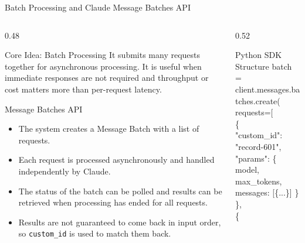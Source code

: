 \documentclass[
        11pt,
        compress,
        xcolor={dvipsnames}
    ]{beamer}
\begin{document}
\begin{frame}[shrink=2]{Batch Processing and Claude Message Batches API}
  \begin{columns}[T]
    \begin{column}{0.48\textwidth}
    \scriptsize
      \begin{block}{Core Idea: Batch Processing}
        It submits many requests together for asynchronous processing.
        It is useful when immediate responses are not required and throughput or cost matters more than per-request latency.
      \end{block}
      \vspace{0.3em}
      \begin{block}{Message Batches API}
        \begin{itemize}\setlength{\itemsep}{0.3em}
          \item The system creates a Message Batch with a list of requests.
          \item Each request is processed asynchronously and handled independently by Claude.
          \item The status of the batch can be polled and results can be retrieved when processing has ended for all requests.
          \item Results are not guaranteed to come back in input order, so \texttt{custom\_id} is used to match them back.
        \end{itemize}
      \end{block}
    \end{column}
    \begin{column}{0.52\textwidth}
      \begin{block}{Python SDK Structure}
        \ttfamily\tiny
        batch = client.messages.batches.create(\\
        \hspace*{1em}requests=[\\
        \hspace*{2em}\{\\
        \hspace*{3em}"custom\_id": "record-601",\\
        \hspace*{3em}"params": \{ model, max\_tokens,\\
        \hspace*{5em}messages: [\{...\}] \}\\
        \hspace*{2em}\},\\
        \hspace*{2em}\{\\

\end{block}
\end{column}
\end{columns}
\end{frame}
\end{document}
